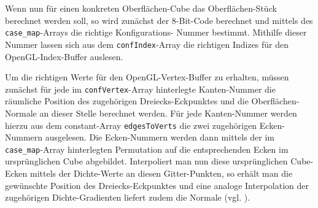 \noindent Wenn nun für einen konkreten Oberflächen-Cube das Oberflächen-Stück berechnet werden soll, so wird zunächst der $8$-Bit-Code berechnet und mittels des {\tt case\_map}-Arrays die richtige Konfigurations-
Nummer bestimmt. Mithilfe dieser Nummer lassen sich aus dem {\tt confIndex}-Array die richtigen Indizes für den OpenGL-Index-Buffer auslesen.
\smallskip

\noindent Um die richtigen Werte für den OpenGL-Vertex-Buffer zu erhalten, müssen zunächst für jede im {\tt confVertex}-Array hinterlegte Kanten-Nummer die räumliche Position des zugehörigen Dreiecks-Eckpunktes und die Oberflächen-Normale an dieser Stelle berechnet werden. Für jede Kanten-Nummer werden hierzu aus dem constant-Array {\tt edgesToVerts} die zwei zugehörigen Ecken-Nummern ausgelesen. Die Ecken-Nummern werden dann mittels der im {\tt case\_map}-Array hinterlegten Permutation auf die entsprechenden Ecken im ursprünglichen Cube abgebildet. Interpoliert man nun diese ursprünglichen Cube-Ecken mittels der Dichte-Werte an diesen Gitter-Punkten, so erhält man die gewünschte Position des Dreiecks-Eckpunktes und eine analoge Interpolation der zugehörigen Dichte-Gradienten liefert zudem die Normale (vgl. \cite[S. 165]{MC}).
